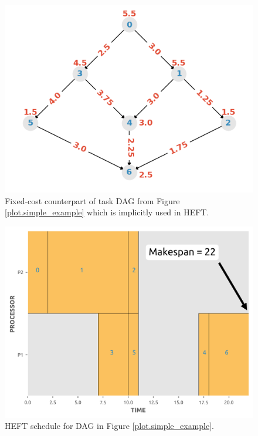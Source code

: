 \documentclass[12pt]{article}
\begin{document}
\begin{figure}
	\centering	
	\includegraphics[scale=0.7]{simple_graph_fixed.png}
	\caption{Fixed-cost counterpart of task DAG from Figure \ref{plot.simple_example} which is implicitly used in HEFT.}	
	\label{plot.example_fixed}
\end{figure}  

\begin{figure}
	\centering	
	\includegraphics[scale=0.8]{heft_schedule_example.png}
	\caption{HEFT schedule for DAG in Figure \ref{plot.simple_example}.}	
	\label{plot.heft_schedule_example}
\end{figure}
\end{document}
